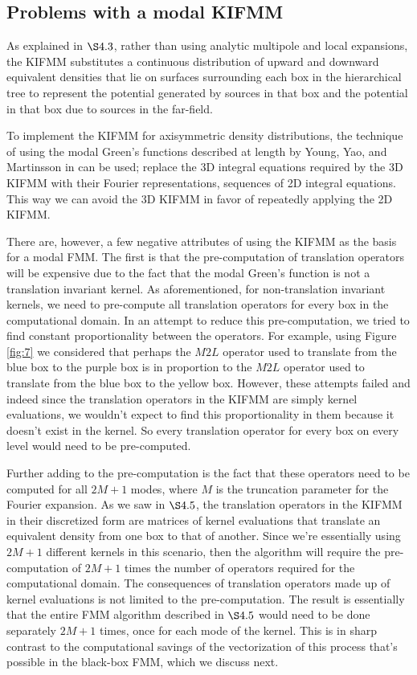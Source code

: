 \documentclass[11pt, oneside]{article}   	%
\begin{document}
\subsection{Problems with a modal KIFMM}
As explained in $\S4.3$, rather than using analytic multipole and local expansions, the KIFMM substitutes a continuous distribution of upward and downward equivalent densities that lie on surfaces surrounding each box in the hierarchical tree to represent the potential generated by sources in that box and the potential in that box due to sources in the far-field.

To implement the KIFMM for axisymmetric density distributions, the technique of using the modal Green's functions described at length by Young, Yao, and Martinsson in \cite{YYM} can be used; replace the 3D integral equations required by the 3D KIFMM with their Fourier representations, sequences of 2D integral equations. This way we can avoid the 3D KIFMM in favor of repeatedly applying the 2D KIFMM.

There are, however, a few negative attributes of using the KIFMM as the basis for a modal FMM. The first is that the pre-computation of translation operators will be expensive due to the fact that the modal Green's function is not a translation invariant kernel. As aforementioned, for non-translation invariant kernels, we need to pre-compute all translation operators for every box in the computational domain. In an attempt to reduce this pre-computation, we tried to find constant proportionality between the operators. For example, using Figure \ref{fig:7} we considered that perhaps the $M2L$ operator used to translate from the blue box to the purple box is in proportion to the $M2L$ operator used to translate from the blue box to the yellow box. However, these attempts failed and indeed since the translation operators in the KIFMM are simply kernel evaluations, we wouldn't expect to find this proportionality in them because it doesn't exist in the kernel. So every translation operator for every box on every level would need to be pre-computed.

Further adding to the pre-computation is the fact that these operators need to be computed for all $2M+1$ modes, where $M$ is the truncation parameter for the Fourier expansion. As we saw in $\S4.5$, the translation operators in the KIFMM in their discretized form are matrices of kernel evaluations that translate an equivalent density from one box to that of another. Since we're essentially using $2M+1$ different kernels in this scenario, then the algorithm will require the pre-computation of $2M+1$ times the number of operators required for the computational domain. The consequences of translation operators made up of kernel evaluations is not limited to the pre-computation. The result is essentially that the entire FMM algorithm described in $\S4.5$ would need to be done separately $2M+1$ times, once for each mode of the kernel. This is in sharp contrast to the computational savings of the vectorization of this process that's possible in the black-box FMM, which we discuss next.
\end{document}
